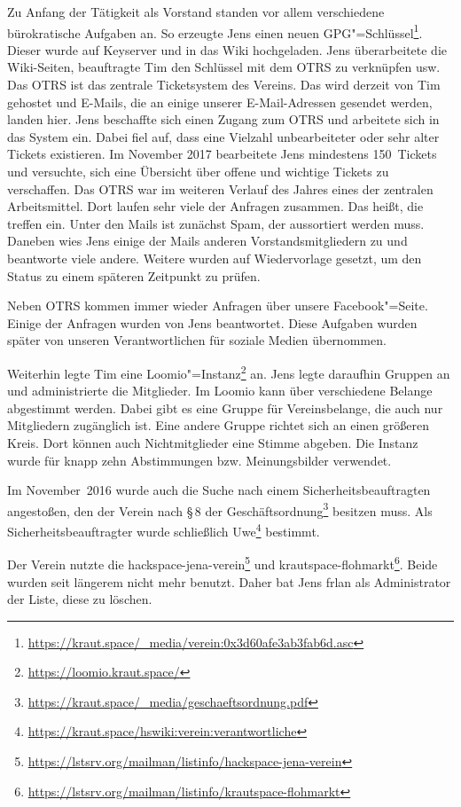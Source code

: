 \documentclass[ngerman]{scrartcl}
\begin{document}
Zu Anfang der Tätigkeit als Vorstand standen vor allem verschiedene
bürokratische Aufgaben an. So erzeugte Jens einen neuen
GPG"=Schlüssel\footnote{\url{https://kraut.space/_media/verein:0x3d60afe3ab3fab6d.asc}}. Dieser
wurde auf Keyserver und in das Wiki hochgeladen. Jens überarbeitete die
Wiki-Seiten, beauftragte Tim den Schlüssel mit dem OTRS zu verknüpfen usw. Das
OTRS ist das zentrale Ticketsystem des Vereins. Das wird derzeit von Tim
gehostet und E-Mails, die an einige unserer E-Mail-Adressen gesendet werden,
landen hier. Jens beschaffte sich einen Zugang zum OTRS und arbeitete sich in
das System ein. Dabei fiel auf, dass eine Vielzahl unbearbeiteter oder sehr
alter Tickets existieren. Im November 2017 bearbeitete Jens mindestens
150~Tickets und versuchte, sich eine Übersicht über offene und wichtige Tickets
zu verschaffen. Das OTRS war im weiteren Verlauf des Jahres eines der zentralen
Arbeitsmittel. Dort laufen sehr viele der Anfragen zusammen. Das heißt, die
treffen ein. Unter den Mails ist zunächst Spam, der aussortiert werden
muss. Daneben wies Jens einige der Mails anderen Vorstandsmitgliedern zu und
beantworte viele andere. Weitere wurden auf Wiedervorlage gesetzt, um den Status
zu einem späteren Zeitpunkt zu prüfen.

Neben OTRS kommen immer wieder Anfragen über unsere Facebook"=Seite. Einige der
Anfragen wurden von Jens beantwortet. Diese Aufgaben wurden später von unseren
Verantwortlichen für soziale Medien übernommen.

Weiterhin legte Tim eine
Loomio"=Instanz\footnote{\url{https://loomio.kraut.space/}} an. Jens legte
daraufhin Gruppen an und administrierte die Mitglieder. Im Loomio kann über
verschiedene Belange abgestimmt werden. Dabei gibt es eine Gruppe für
Vereinsbelange, die auch nur Mitgliedern zugänglich ist. Eine andere Gruppe
richtet sich an einen größeren Kreis. Dort können auch Nichtmitglieder eine
Stimme abgeben. Die Instanz wurde für knapp zehn Abstimmungen
bzw. Meinungsbilder verwendet.

Im November~2016 wurde auch die Suche nach einem Sicherheitsbeauftragten
angestoßen, den der Verein nach §\,8 der
Geschäftsordnung\footnote{\url{https://kraut.space/_media/geschaeftsordnung.pdf}}
besitzen muss. Als Sicherheitsbeauftragter wurde schließlich
Uwe\footnote{\url{https://kraut.space/hswiki:verein:verantwortliche}} bestimmt.

Der Verein nutzte die
hackspace-jena-verein\footnote{\url{https://lstsrv.org/mailman/listinfo/hackspace-jena-verein}}
und
krautspace-flohmarkt\footnote{\url{https://lstsrv.org/mailman/listinfo/krautspace-flohmarkt}}. Beide
wurden seit längerem nicht mehr benutzt. Daher bat Jens frlan als Administrator
der Liste, diese zu löschen.
\end{document}
